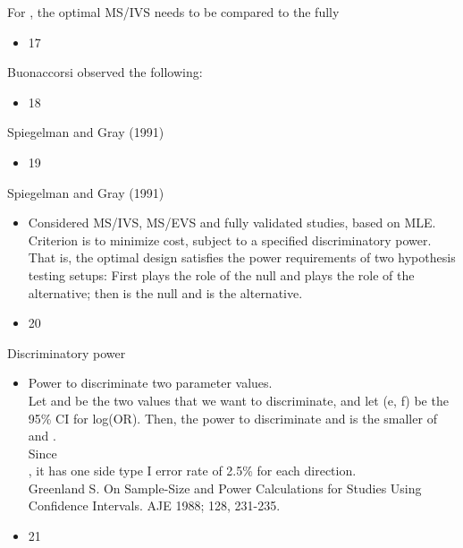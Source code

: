 \documentclass{beamer}
\begin{document}
\begin{frame}{For             , the optimal MS/IVS needs to be compared to the fully}
\begin{itemize}
\item 17
\end{itemize}
\end{frame}
\begin{frame}{Buonaccorsi observed the following:}
\begin{itemize}
\item 18
\end{itemize}
\end{frame}
\begin{frame}{Spiegelman and Gray (1991)}
\begin{itemize}
\item 19
\end{itemize}
\end{frame}
\begin{frame}{Spiegelman and Gray (1991)}
\begin{itemize}
\item Considered MS/IVS, MS/EVS and fully validated studies, based on MLE. \\ Criterion is to minimize cost, subject to a specified discriminatory power. That is, the optimal design satisfies the power requirements of two hypothesis testing setups: First                plays the role of the null and                 plays the role of the alternative; then                is the null and                is the alternative.
\end{itemize}
\begin{itemize}
\item 20
\end{itemize}
\end{frame}
\begin{frame}{Discriminatory power}
\begin{itemize}
\item Power to discriminate two parameter values. \\ Let                  and                be the two values that we want to discriminate, and let (e, f) be the 95\% CI for log(OR). Then, the power to discriminate               and                 is the smaller of   \\    and                                               .    \\ Since                                                 \\                                                    , it has one side 	type I error rate of 2.5\% for each direction. \\ Greenland S. On Sample-Size and Power Calculations for Studies Using Confidence Intervals. AJE 1988; 128, 231-235.
\end{itemize}
\begin{itemize}
\item 21
\end{itemize}
\end{frame}
\end{document}

